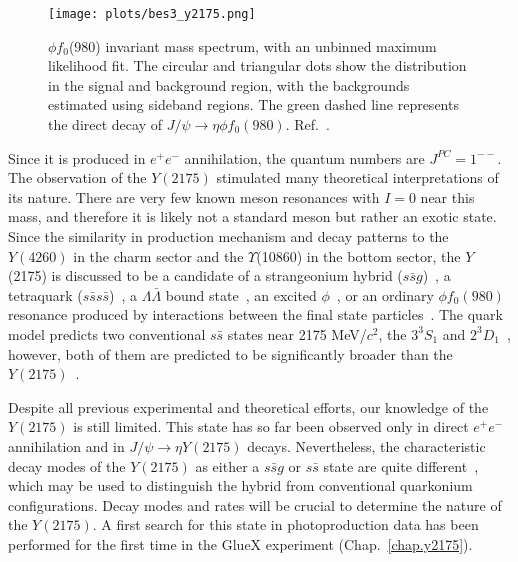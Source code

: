     \begin{figure}[htbp]
        \centering
            \texttt{[image: plots/bes3\_y2175.png]}
            \caption{$\phi f_0$(980) invariant mass spectrum, with an unbinned maximum likelihood fit. The circular and triangular dots show the distribution in the signal and background region, with the backgrounds estimated using sideband regions. The green dashed line represents the direct decay of $J/\psi \rightarrow \eta \phi f_0(980)$. Ref.~\cite{Ablikim15}.}
            \label{fig.1.4.3}
    \end{figure}

\noindent Since it is produced in $e^+e^-$ annihilation, the quantum numbers are $J^{PC} = 1^{--}$. The observation of the $Y(2175)$ stimulated many theoretical interpretations of its nature. There are very few known meson resonances with $I = 0$ near this mass, and therefore it is likely not a standard meson but rather an exotic state. Since the similarity in production mechanism and decay patterns to the $Y(4260)$ in the charm sector and the $\Upsilon$(10860) in the bottom sector, the $Y$(2175) is discussed to be a candidate of a strangeonium hybrid ($s\bar{s}g$)~\cite{Gui07}, a tetraquark ($s\bar{s}s\bar{s}$)~\cite{Chen08}, a $\Lambda \bar{\Lambda}$ bound state~\cite{Klempt07}, an excited $\phi$~\cite{Coito09}, or an ordinary $\phi f_0(980)$ resonance produced by interactions between the final state particles~\cite{Alvarez09}. The quark model predicts two conventional $s\bar{s}$ states near 2175 MeV/$c^2$, the ${3}^{3}\!S_{1}$ and ${2}^{3}\!D_{1}$~\cite{Godfrey85, Barnes97}, however, both of them are predicted to be significantly broader than the $Y(2175)$~\cite{Barnes03, Ding07}.
~\par Despite all previous experimental and theoretical efforts, our knowledge of the $Y(2175)$ is still limited. This state has so far been observed only in direct $e^{+}e^{-}$ annihilation and in $J/\psi \rightarrow \eta Y(2175)$ decays. Nevertheless, the characteristic decay modes of the $Y(2175)$ as either a $s\bar{s}g$ or $s\bar{s}$ state are quite different~\cite{Gui07, Isgur85}, which may be used to distinguish the hybrid from conventional quarkonium configurations. Decay modes and rates will be crucial to determine the nature of the $Y(2175)$. A first search for this state in photoproduction data has been performed for the first time in the GlueX experiment (Chap.~\ref{chap.y2175}).

